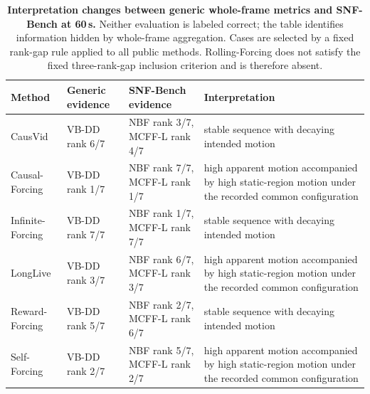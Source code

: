 \begin{table}[t]
\centering
\small
\begin{tabular}{l l l p{}}
\toprule
Method & Generic evidence & SNF-Bench evidence & Interpretation \\
\midrule
CausVid & VB-DD rank 6/7 & NBF rank 3/7, MCFF-L rank 4/7 & stable sequence with decaying intended motion \\
Causal-Forcing & VB-DD rank 1/7 & NBF rank 7/7, MCFF-L rank 1/7 & high apparent motion accompanied by high static-region motion under the recorded common configuration \\
Infinite-Forcing & VB-DD rank 7/7 & NBF rank 1/7, MCFF-L rank 7/7 & stable sequence with decaying intended motion \\
LongLive & VB-DD rank 3/7 & NBF rank 6/7, MCFF-L rank 3/7 & high apparent motion accompanied by high static-region motion under the recorded common configuration \\
Reward-Forcing & VB-DD rank 5/7 & NBF rank 2/7, MCFF-L rank 6/7 & stable sequence with decaying intended motion \\
Self-Forcing & VB-DD rank 2/7 & NBF rank 5/7, MCFF-L rank 2/7 & high apparent motion accompanied by high static-region motion under the recorded common configuration \\
\bottomrule
\end{tabular}
\caption{\textbf{Interpretation changes between generic whole-frame metrics and SNF-Bench at 60\,s.} Neither evaluation is labeled correct; the table identifies information hidden by whole-frame aggregation. Cases are selected by a fixed rank-gap rule applied to all public methods. Rolling-Forcing does not satisfy the fixed three-rank-gap inclusion criterion and is therefore absent.}
\label{tab:interpretation_changes}
\end{table}